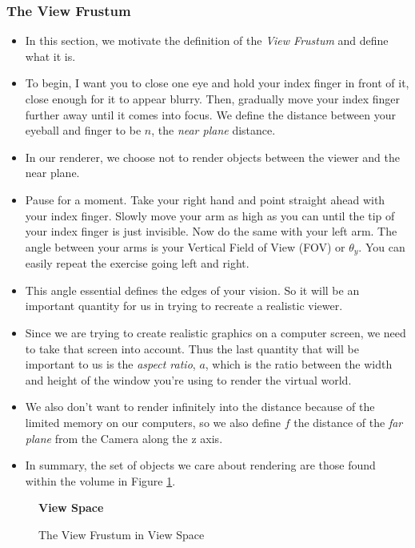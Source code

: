 \documentclass{article}
\begin{document}
\subsubsection{The View Frustum}
\begin{itemize}
	\item In this section, we motivate the definition of the \textit{View Frustum} and define what it is.

	\item To begin, I want you to close one eye and hold your index finger in front of it, close enough for it to appear blurry. Then, gradually move your index finger further away until it comes into focus. We define the distance between your eyeball and finger to be $n$, the \textit{near plane} distance.
	
	\item In our renderer, we choose not to render objects between the viewer and the near plane. 

	\item Pause for a moment. Take your right hand and point straight ahead with your index finger. Slowly move your arm as high as you can until the tip of your index finger is just invisible. Now do the same with your left arm. The angle between your arms is your Vertical Field of View (FOV) or $\theta_y$. You can easily repeat the exercise going left and right.

	\item This angle essential defines the edges of your vision. So it will be an important quantity for us in trying to recreate a realistic viewer.
	\item Since we are trying to create realistic graphics on a computer screen, we need to take that screen into account. Thus the last quantity that will be important to us is the \textit{aspect ratio}, $a$, which is the ratio between the width and height of the window you're using to render the virtual world.

	\item We also don't want to render infinitely into the distance because of the limited memory on our computers, so we also define $f$ the distance of the \textit{far plane} from the Camera along the z axis.

	\item In summary, the set of objects we care about rendering are those found within the volume in Figure \ref{fig:view-frustum}.
\end{itemize}

\begin{figure}[h!]
\centering
	\textbf{View Space}\\[0.5em]%
	\resizebox{0.6\textwidth}{!}{%
	}
	\caption{The View Frustum in View Space}\label{fig:view-frustum}
\end{figure}
\end{document}

